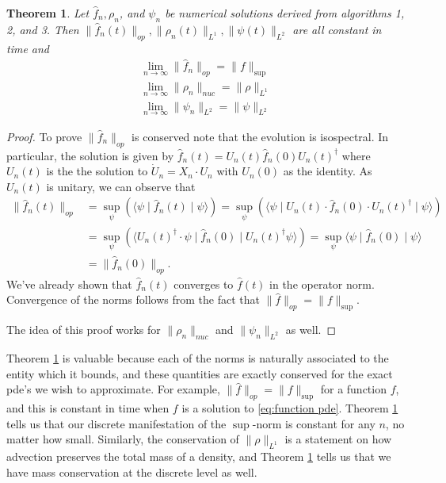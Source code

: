 \documentclass[12pt]{amsart}
\newtheorem{thm}{Theorem}[section]
\begin{document}
\begin{thm} \label{thm:norms}
	Let $\hat{f}_{n}, \rho_{n}$, and $\psi_{n}$ be numerical solutions derived from algorithms 1, 2, and 3.
	Then $\| \hat{f}_{n}(t) \|_{op}, \|\rho_{n}(t)\|_{L^{1}} , \| \psi (t)\|_{L^{2}}$ are all constant in time
	and
	\begin{align}
		\lim_{n \to \infty} \| \hat{f}_{n} \|_{op} = \| f \|_{\sup} \\
		\lim_{n \to \infty} \| \rho_{n} \|_{nuc} = \| \rho \|_{L^{1}} \\
		\lim_{n \to \infty} \| \psi_{n} \|_{L^{2}} = \| \psi \|_{L^{2}}
	\end{align}
\end{thm}
\begin{proof}
	To prove $\| \hat{f}_{n} \|_{op}$ is conserved note that the evolution is isospectral.
	In particular, the solution is given by $\hat{f}_{n}(t) = U_{n}(t) \hat{f}_{n}(0) U_{n}(t)^{\dagger}$
	where $U_{n}(t)$ is the the solution to $\dot{U}_{n} = X_{n} \cdot U_{n}$ with $U_{n}(0)$ as the identity.
	As $U_{n}(t)$ is unitary, we can observe that 
	\begin{align}
		\| \hat{f}_{n}(t) \|_{op}  &= \sup_{\psi}( \langle \psi \mid \hat{f}_{n}(t) \mid \psi \rangle) = \sup_{\psi}\left( \langle \psi \mid U_{n}(t) \cdot \hat{f}_{n}(0) \cdot U_{n}(t)^{\dagger} \mid \psi \rangle \right) \\
			&= \sup_{\psi} \left( \langle U_{n}(t)^{\dagger} \cdot \psi \mid \hat{f}_{n}(0) \mid U_{n}(t)^{\dagger} \psi \rangle \right) = \sup_{\psi} \langle \psi \mid \hat{f}_{n}(0) \mid \psi \rangle \\
			&= \| \hat{f}_{n}(0) \|_{op}.
	\end{align}
	We've already shown that $\hat{f}_{n}(t)$ converges to $\hat{f}(t)$ in the operator norm.
	Convergence of the norms follows from the fact that $\| \hat{f} \|_{op} = \| f \|_{\sup}$.
	
	The idea of this proof works for $\| \rho_{n} \|_{nuc}$ and $\| \psi_{n} \|_{L^{2}}$ as well.
\end{proof}

Theorem \ref{thm:norms} is valuable because each of the norms is naturally associated to the entity which it bounds, and these quantities are exactly conserved for the exact pde's we wish to approximate.
For example, $\| \hat{f} \|_{op} = \| f \|_{\sup}$ for a function $f$, and this is constant in time when $f$ is a solution to \eqref{eq:function pde}.
Theorem \ref{thm:norms} tells us that our discrete manifestation of the $\sup$-norm is constant for any $n$, no matter how small.
Similarly, the conservation of $\| \rho \|_{L^{1}}$ is a statement on how advection preserves the total mass of a density, and Theorem \ref{thm:norms} tells us that we have mass conservation at the discrete level as well.
\end{document}
